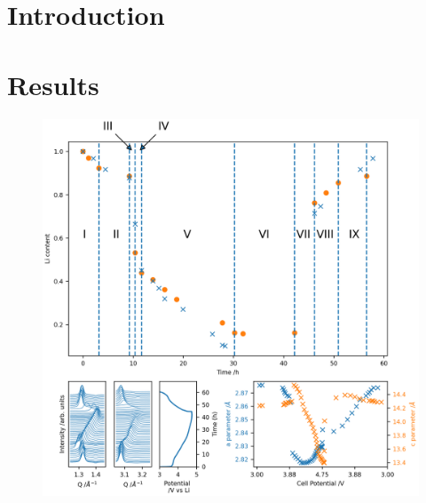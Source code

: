 \documentclass{article}
\begin{document}
\maketitle

\section{Introduction}

\blindtext

\section{Results}

\begin{figure}
  \includegraphics{figures/p1-xrd.png}
  \caption{}
\end{figure}
\end{document}
